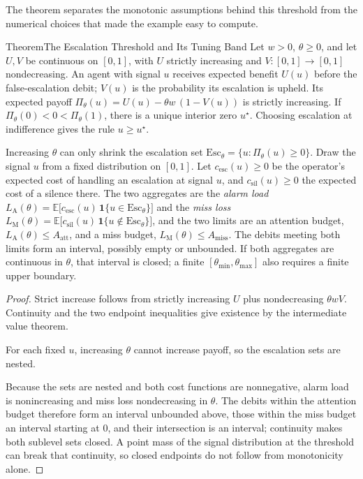 \documentclass[11pt,a4paper]{article}
\theoremstyle{definition}
\theoremstyle{plain}
\begin{document}
The theorem separates the monotonic assumptions behind this threshold from
the numerical choices that made the example easy to compute.

\begin{pdclaim}{Theorem}{The Escalation Threshold and Its Tuning Band}
\setlength{\parskip}{4pt plus 1pt}
\label{thm:escalation-threshold}
Let $w>0$, $\theta\ge0$, and let $U,V$ be continuous on $[0,1]$, with $U$
strictly increasing and $V:[0,1]\to[0,1]$ nondecreasing. An agent with signal
$u$ receives expected benefit $U(u)$ before the false-escalation debit; $V(u)$ is the
probability its escalation is upheld. Its expected payoff
$\Pi_\theta(u)=U(u)-\theta w\,(1-V(u))$ is strictly increasing. If
$\Pi_\theta(0)<0<\Pi_\theta(1)$, there is a unique interior zero $u^\star$.
Choosing escalation at indifference gives the rule $u\ge u^\star$.

Increasing $\theta$ can only shrink the escalation set
$\mathrm{Esc}_\theta=\{u:\Pi_\theta(u)\ge0\}$. Draw the signal $u$ from a fixed
distribution on $[0,1]$. Let $c_{\mathrm{esc}}(u)\ge0$ be the operator's expected
cost of handling an escalation at signal $u$, and $c_{\mathrm{sil}}(u)\ge0$ the
expected cost of a silence there. The two aggregates are the \emph{alarm load}
$L_{\mathrm{A}}(\theta)=\mathbb E\bigl[c_{\mathrm{esc}}(u)\,\mathbf 1\{u\in\mathrm{Esc}_\theta\}\bigr]$
and the \emph{miss loss}
$L_{\mathrm{M}}(\theta)=\mathbb E\bigl[c_{\mathrm{sil}}(u)\,\mathbf 1\{u\notin\mathrm{Esc}_\theta\}\bigr]$,
and the two limits are an attention budget, $L_{\mathrm{A}}(\theta)\le A_{\mathrm{att}}$,
and a miss budget, $L_{\mathrm{M}}(\theta)\le A_{\mathrm{miss}}$. The debits meeting
both limits form an interval, possibly empty or unbounded. If both aggregates
are continuous in $\theta$, that \mbox{interval} is closed; a finite
$[\theta_{\min},\theta_{\max}]$ also requires a finite upper boundary.
\end{pdclaim}
\begin{proof}
\setlength{\parskip}{4pt plus 1pt}
Strict increase follows from strictly increasing $U$ plus nondecreasing
$\theta wV$. Continuity and the two endpoint inequalities give existence by
the intermediate value theorem.

For each fixed $u$, increasing $\theta$
cannot increase payoff, so the escalation sets are nested.

Because the sets are nested and both cost functions are nonnegative, alarm
load is nonincreasing and miss loss nondecreasing in $\theta$. The debits within
the attention budget therefore form an interval unbounded above, those within the
miss budget an interval starting at $0$, and their intersection is an interval;
continuity makes both sublevel sets closed. A point mass of the signal
distribution at the threshold can break that continuity, so closed endpoints
do not follow from monotonicity alone.
\end{proof}
\end{document}
